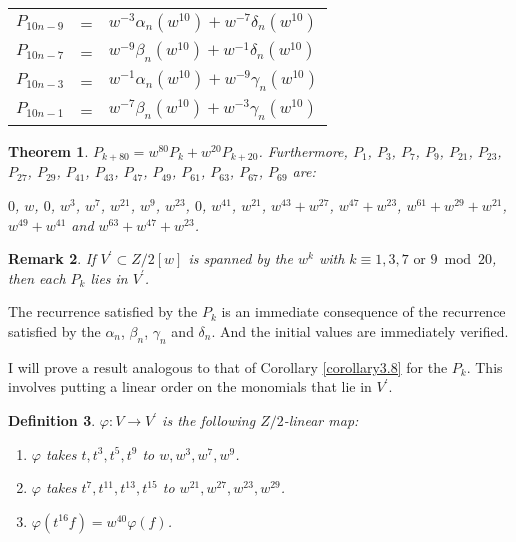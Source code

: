 \documentclass{monsky2009}
\newtheorem{definition}{Definition}[section]
\newtheorem{theorem}[definition]{Theorem}
\newtheorem{remark}[definition]{Remark}
\begin{document}
\begin{center}
\begin{tabular}{lcl}
$P_{10n-9}$ &=& $w^{-3}\alpha_{n}(w^{10})+w^{-7}\delta_{n}(w^{10})$\\
$P_{10n-7}$ &=& $w^{-9}\beta_{n}(w^{10})+w^{-1}\delta_{n}(w^{10})$\\
$P_{10n-3}$ &=& $w^{-1}\alpha_{n}(w^{10})+w^{-9}\gamma_{n}(w^{10})$\\
$P_{10n-1}$ &=& $w^{-7}\beta_{n}(w^{10})+w^{-3}\gamma_{n}(w^{10})$
\end{tabular}
\end{center}

\begin{theorem}
\label{theorem5.1}
$P_{k+80} = w^{80}P_{k}+w^{20}P_{k+20}$. Furthermore, $P_{1}$, $P_{3}$, $P_{7}$, $P_{9}$, $P_{21}$, $P_{23}$, $P_{27}$, $P_{29}$, $P_{41}$, $P_{43}$, $P_{47}$, $P_{49}$, $P_{61}$, $P_{63}$, $P_{67}$, $P_{69}$ are:

$0$, $w$, $0$, $w^{3}$, $w^{7}$, $w^{21}$, $w^{9}$, $w^{23}$, $0$, $w^{41}$, $w^{21}$, $w^{43}+w^{27}$, $
w^{47}+w^{23}$, $w^{61}+w^{29}+w^{21}$, \linebreak $w^{49}+w^{41}$ and $w^{63}+w^{47}+w^{23}$.
\end{theorem}

\begin{remark}
\label{remark5.2}
If $V^{\prime}\subset Z/2[w]$ is spanned by the $w^{k}$ with $k \equiv 1,3,7 \mbox{ or } 9\bmod{20}$, then each $P_{k}$ lies in $V^{\prime}$.
\end{remark}

The recurrence satisfied by the $P_{k}$ is an immediate consequence of the recurrence satisfied by the $\alpha_{n}$, $\beta_{n}$, $\gamma_{n}$ and $\delta_{n}$. And the initial values are immediately verified.

I will prove a result analogous to that of Corollary \ref{corollary3.8} for the $P_{k}$. This involves putting a linear order on the monomials that lie in $V^{\prime}$.

\begin{definition}
\label{def5.3}
$\varphi : V\rightarrow V^{\prime}$ is the following $Z/2$-linear map:
\begin{enumerate}
\item[(a)] $\varphi$ takes $t,t^{3},t^{5},t^{9}$ to $w,w^{3},w^{7},w^{9}$.
\item[(b)] $\varphi$ takes $t^{7},t^{11},t^{13},t^{15}$ to $w^{21},w^{27},w^{23},w^{29}$.
\item[(c)] $\varphi(t^{16}f)=w^{40}\varphi(f)$.
\end{enumerate}
\end{definition}
\end{document}
